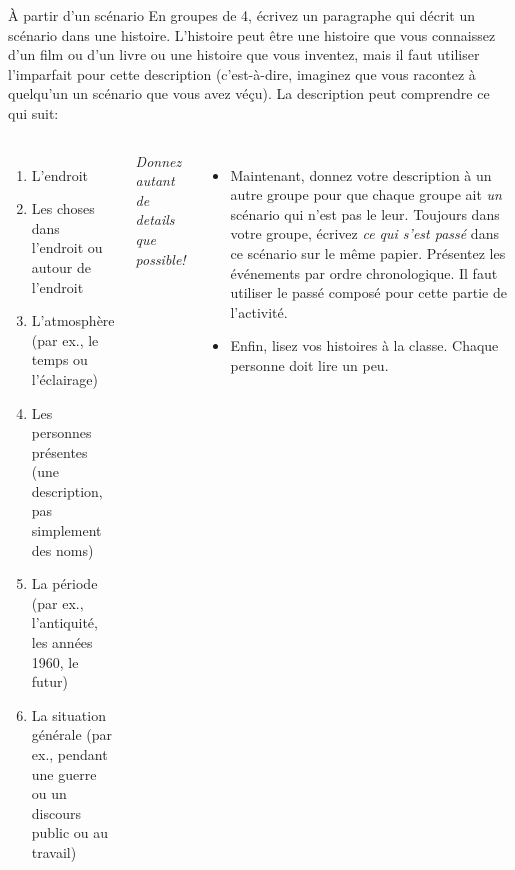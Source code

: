 \begin{frame}{À partir d'un scénario}
  \scriptsize
  En groupes de 4, écrivez un paragraphe qui décrit un scénario dans une histoire.
  L'histoire peut être une histoire que vous connaissez d'un film ou d'un livre ou une histoire que vous inventez, mais \alert{il faut utiliser l'imparfait} pour cette description (c'est-à-dire, imaginez que vous racontez à quelqu'un un scénario que vous avez véçu).
  La description peut comprendre ce qui suit:
  \begin{columns}
      \begin{enumerate}
        \item L'endroit
        \item Les choses dans l'endroit ou autour de l'endroit
        \item L'atmosphère (par ex., le temps ou l'éclairage)
        \item Les personnes présentes (une description, pas simplement des noms)
        \item La période (par ex., l'antiquité, les années 1960, le futur)
        \item La situation générale (par ex., pendant une guerre ou un discours public ou au travail)
      \end{enumerate}
      \emph{Donnez autant de details que possible!}
      \begin{itemize}
        \item<2-> Maintenant, donnez votre description à un autre groupe pour que chaque groupe ait \emph{un} scénario qui n'est pas le leur.
          Toujours dans votre groupe, écrivez \emph{ce qui s'est passé} dans ce scénario sur le même papier.
          Présentez les événements par ordre chronologique.
          \alert{Il faut utiliser le passé composé} pour cette partie de l'activité.
        \item<3-> Enfin, lisez vos histoires à la classe.
          Chaque personne doit lire un peu.
      \end{itemize}
  \end{columns}
\end{frame}